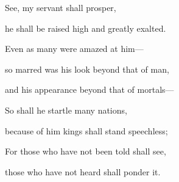 \lettrine[lines=2]{S}{}ee, my servant shall prosper,\par
   he shall be raised high and greatly exalted.\par
\noindent Even as many were amazed at him—\par
   so marred was his look beyond that of man,\par
   and his appearance beyond that of mortals—\par
\noindent So shall he startle many nations,\par
   because of him kings shall stand speechless;\par
\noindent For those who have not been told shall see,\par
   those who have not heard shall ponder it.